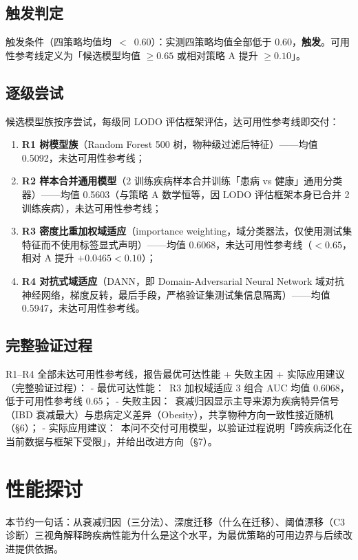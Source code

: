 \documentclass{internal-report}
\begin{document}
\subsection{触发判定}
触发条件（四策略均值均\ $<$\ 0.60）：实测四策略均值全部低于 0.60，\textbf{触发}。可用性参考线定义为「候选模型均值 $\ge 0.65$ 或相对策略 A 提升 $\ge 0.10$」。

\subsection{逐级尝试}
候选模型族按序尝试，每级同 LODO 评估框架评估，达可用性参考线即交付：
\begin{enumerate}
  \item \textbf{R1 树模型族}（Random Forest 500 树，物种级过滤后特征）——均值 0.5092，未达可用性参考线；
  \item \textbf{R2 样本合并通用模型}（2 训练疾病样本合并训练「患病 vs 健康」通用分类器）——均值 0.5603（与策略 A 数学恒等，因 LODO 评估框架本身已合并 2 训练疾病），未达可用性参考线；
  \item \textbf{R3 密度比重加权域适应}（importance weighting，域分类器法，仅使用测试集特征而不使用标签显式声明）——均值 0.6068，未达可用性参考线（$<0.65$，相对 A 提升 $+0.0465<0.10$）；
  \item \textbf{R4 对抗式域适应}（DANN，即 Domain-Adversarial Neural Network 域对抗神经网络，梯度反转，最后手段，严格验证集测试集信息隔离）——均值 0.5947，未达可用性参考线。
\end{enumerate}

\subsection{完整验证过程}
R1--R4 全部未达可用性参考线，报告最优可达性能 + 失败主因 + 实际应用建议（完整验证过程）：
- 最优可达性能：\ R3 加权域适应 3 组合 AUC 均值 0.6068，低于可用性参考线 0.65；
- 失败主因：\ 衰减归因显示主导来源为疾病特异信号（IBD 衰减最大）与患病定义差异（Obesity），共享物种方向一致性接近随机（§6）；
- 实际应用建议：\ 本问不交付可用模型，以验证过程说明「跨疾病泛化在当前数据与框架下受限」，并给出改进方向（§7）。


\section{性能探讨}

本节约一句话：从衰减归因（三分法）、深度迁移（什么在迁移）、阈值漂移（C3 诊断）三视角解释跨疾病性能为什么是这个水平，为最优策略的可用边界与后续改进提供依据。
\end{document}
